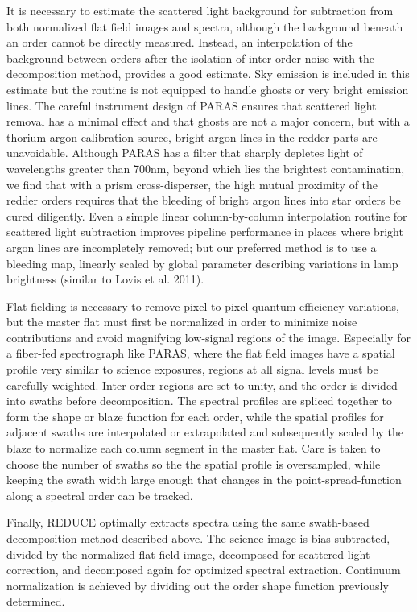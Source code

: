\documentclass[12pt,preprint]{emulateapj}
\begin{document}
It is necessary to estimate the scattered light background for subtraction from both normalized flat field images and spectra, although the background beneath an order cannot be directly measured. Instead, an interpolation of the background between orders after the isolation of inter-order noise with the decomposition method, provides a good estimate. Sky emission is included in this estimate but the routine is not equipped to handle ghosts or very bright emission lines. The careful instrument design of PARAS ensures that scattered light removal has a minimal effect and that ghosts are not a major concern, but with a thorium-argon calibration source, bright argon lines in the redder parts are unavoidable. Although PARAS has a filter that sharply depletes light of wavelengths greater than 700nm, beyond which lies the brightest contamination, we find that with a prism cross-disperser, the high mutual proximity of the redder orders requires that the bleeding of bright argon lines into star orders be cured diligently. Even a simple linear column-by-column interpolation routine for scattered light subtraction improves pipeline performance in places where bright argon lines are incompletely removed; but our preferred method is to use a bleeding map, linearly scaled by global parameter describing variations in lamp brightness (similar to Lovis et al. 2011).

Flat fielding is necessary to remove pixel-to-pixel quantum efficiency variations, but the master flat must first be  normalized in order to minimize noise contributions and avoid magnifying low-signal regions of the image. Especially for a fiber-fed spectrograph like PARAS, where the flat field images have a spatial profile very similar to science exposures, regions at all signal levels must be carefully weighted. Inter-order regions are set to unity, and the order is divided into swaths before decomposition. The spectral profiles are spliced together to form the shape or blaze function for each order, while the spatial profiles for adjacent swaths are interpolated or extrapolated and subsequently scaled by the blaze to normalize each column segment in the master flat. Care is taken to choose the number of swaths so the the spatial profile is oversampled, while keeping the swath width large enough that changes in the point-spread-function along a spectral order can be tracked.      

Finally, REDUCE optimally extracts spectra using the same swath-based decomposition method described above. The science image is bias subtracted, divided by the normalized flat-field image, decomposed for scattered light correction, and decomposed again for optimized spectral extraction. Continuum normalization is achieved by dividing out the order shape function previously determined.
\end{document}
